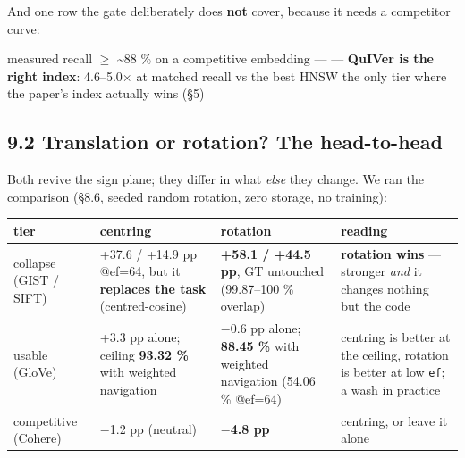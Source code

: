 \documentclass[
  10pt,
]{article}
\newcounter{none} %
\begin{document}
And one row the gate deliberately does \textbf{not} cover, because it
needs a competitor curve:

measured recall $\geq$ \textasciitilde88 \% on a competitive embedding
\textbar{} --- \textbar{} --- \textbar{} \textbf{QuIVer is the right
index}: 4.6--5.0$\times$ at matched recall vs the best HNSW \textbar{} the only
tier where the paper's index actually wins (§5) \textbar{}

\subsection{9.2 Translation or rotation? The
head-to-head}\label{translation-or-rotation-the-head-to-head}

Both revive the sign plane; they differ in what \emph{else} they change.
We ran the comparison (§8.6, seeded random rotation, zero storage, no
training):

{\def\LTcaptype{none} %
\begin{longtable}[]{@{}
  >{\raggedright\arraybackslash}p{}
  >{\raggedright\arraybackslash}p{}
  >{\raggedright\arraybackslash}p{}
  >{\raggedright\arraybackslash}p{}@{}}
\toprule\noalign{}
\begin{minipage}[b]{\linewidth}\raggedright
tier
\end{minipage} & \begin{minipage}[b]{\linewidth}\raggedright
centring
\end{minipage} & \begin{minipage}[b]{\linewidth}\raggedright
rotation
\end{minipage} & \begin{minipage}[b]{\linewidth}\raggedright
reading
\end{minipage} \\
\midrule\noalign{}
\endhead
\bottomrule\noalign{}
\endlastfoot
collapse (GIST / SIFT) & +37.6 / +14.9 pp @ef=64, but it
\textbf{replaces the task} (centred-cosine) & \textbf{+58.1 / +44.5 pp},
GT untouched (99.87--100 \% overlap) & \textbf{rotation wins} ---
stronger \emph{and} it changes nothing but the code \\
usable (GloVe) & +3.3 pp alone; ceiling \textbf{93.32 \%} with weighted
navigation & $-$0.6 pp alone; \textbf{88.45 \%} with weighted navigation
(54.06 \% @ef=64) & centring is better at the ceiling, rotation is
better at low \texttt{ef}; a wash in practice \\
competitive (Cohere) & $-$1.2 pp (neutral) & \textbf{$-$4.8 pp} & centring,
or leave it alone \\
\end{longtable}
}
\end{document}

